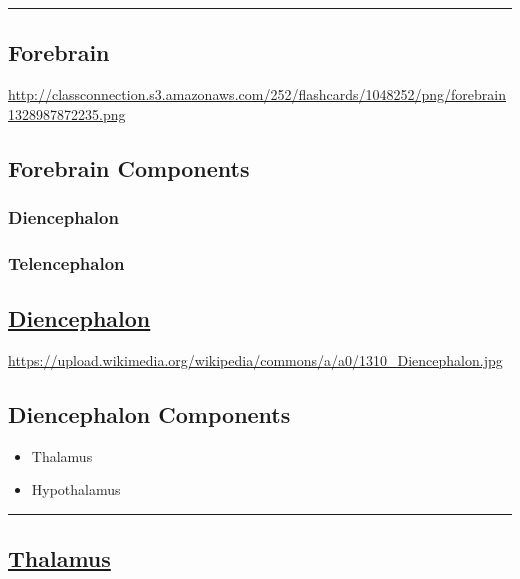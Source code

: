 \documentclass[]{article}
\providecommand{\tightlist}{%
  \setlength{\itemsep}{0pt}\setlength{\parskip}{0pt}}
\begin{document}
\begin{center}\rule{0.5\linewidth}{\linethickness}\end{center}

\subsection{Forebrain}\label{forebrain}

\url{http://classconnection.s3.amazonaws.com/252/flashcards/1048252/png/forebrain1328987872235.png}

\subsection{Forebrain Components}\label{forebrain-components}

\subsubsection{Diencephalon}\label{diencephalon}

\subsubsection{Telencephalon}\label{telencephalon}

\subsection{\texorpdfstring{\href{https://en.wikipedia.org/wiki/Diencephalon}{Diencephalon}}{Diencephalon}}\label{diencephalon-1}

\url{https://upload.wikimedia.org/wikipedia/commons/a/a0/1310_Diencephalon.jpg}

\subsection{Diencephalon Components}\label{diencephalon-components}

\begin{itemize}
\tightlist
\item
  Thalamus
\item
  Hypothalamus
\end{itemize}

\begin{center}\rule{0.5\linewidth}{\linethickness}\end{center}

\subsection{\texorpdfstring{\href{https://en.wikipedia.org/wiki/Thalamus}{Thalamus}}{Thalamus}}\label{thalamus}
\end{document}
